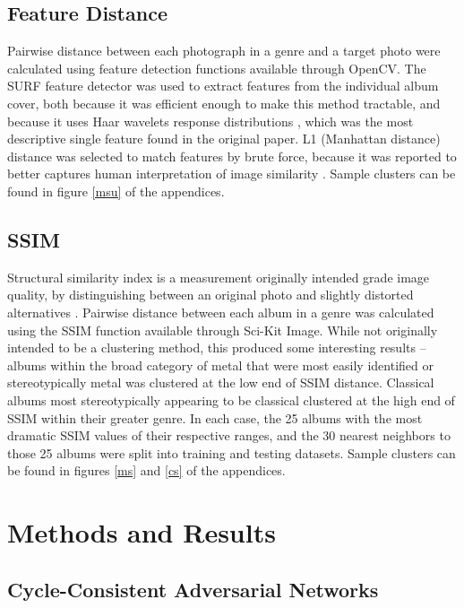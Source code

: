 \documentclass{article}
\begin{document}
\subsection{Feature Distance}

Pairwise distance between each photograph in a genre and a target photo were calculated using feature detection functions available through OpenCV. The SURF feature detector was used to extract features from the individual album cover, both because it was efficient enough to make this method tractable, and because it uses Haar wavelets response distributions \cite{cite-key2}, which was the most descriptive single feature found in the original paper. L1 (Manhattan distance) distance was selected to match features by brute force, because it was reported to better captures human interpretation of image similarity \cite{Sinha06facerecognition}. Sample clusters can be found in figure \ref{msu} of the appendices.

\subsection{SSIM}

Structural similarity index is a measurement originally intended grade image quality, by distinguishing between an original photo and slightly distorted alternatives \cite{1284395}. Pairwise distance between each album in a genre was calculated using the SSIM function available through Sci-Kit Image. While not originally intended to be a clustering method, this produced some interesting results – albums within the broad category of metal that were most easily identified or stereotypically metal was clustered at the low end of SSIM distance. Classical albums most stereotypically appearing to be classical clustered at the high end of SSIM within their greater genre. In each case, the 25 albums with the most dramatic SSIM values of their respective ranges, and the 30 nearest neighbors to those 25 albums were split into training and testing datasets. Sample clusters can be found in figures \ref{ms} and \ref{cs} of the appendices.

\section{Methods and Results}

\subsection{Cycle-Consistent Adversarial Networks}
\end{document}
